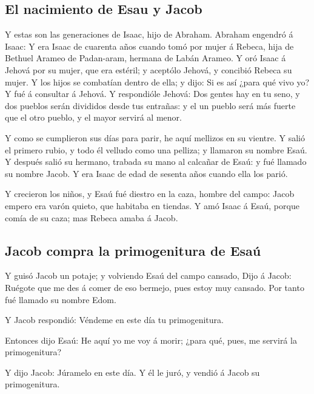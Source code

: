 \hypertarget{el-nacimiento-de-esau-y-jacob}{%
\subsection{El nacimiento de Esau y
Jacob}\label{el-nacimiento-de-esau-y-jacob}}

 Y estas son las generaciones de Isaac, hijo de Abraham.
Abraham engendró á Isaac:  Y era Isaac de cuarenta años
cuando tomó por mujer á Rebeca, hija de Bethuel Arameo de Padan-aram,
hermana de Labán Arameo.  Y oró Isaac á Jehová por su
mujer, que era estéril; y aceptólo Jehová, y concibió Rebeca su mujer.
 Y los hijos se combatían dentro de ella; y dijo: Si es así
¿para qué vivo yo? Y fué á consultar á Jehová.  Y
respondióle Jehová: Dos gentes hay en tu seno, y dos pueblos serán
divididos desde tus entrañas: y el un pueblo será más fuerte que el otro
pueblo, y el mayor servirá al menor.

 Y como se cumplieron sus días para parir, he aquí mellizos
en su vientre.  Y salió el primero rubio, y todo él velludo
como una pelliza; y llamaron su nombre Esaú.  Y después
salió su hermano, trabada su mano al calcañar de Esaú: y fué llamado su
nombre Jacob. Y era Isaac de edad de sesenta años cuando ella los parió.

 Y crecieron los niños, y Esaú fué diestro en la caza,
hombre del campo: Jacob empero era varón quieto, que habitaba en
tiendas.  Y amó Isaac á Esaú, porque comía de su caza; mas
Rebeca amaba á Jacob.

\hypertarget{jacob-compra-la-primogenitura-de-esauxfa}{%
\subsection{Jacob compra la primogenitura de
Esaú}\label{jacob-compra-la-primogenitura-de-esauxfa}}

 Y guisó Jacob un potaje; y volviendo Esaú del campo
cansado,  Dijo á Jacob: Ruégote que me des á comer de eso
bermejo, pues estoy muy cansado. Por tanto fué llamado su nombre Edom.

 Y Jacob respondió: Véndeme en este día tu primogenitura.

 Entonces dijo Esaú: He aquí yo me voy á morir; ¿para qué,
pues, me servirá la primogenitura?

 Y dijo Jacob: Júramelo en este día. Y él le juró, y vendió
á Jacob su primogenitura.

